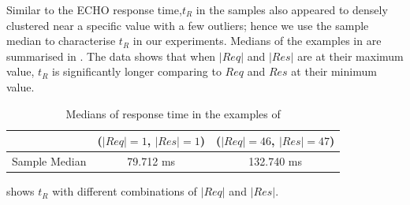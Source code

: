 Similar to the ECHO response time,$t_R$ in the samples also appeared to densely clustered near a specific value with a few outliers; hence we use the sample median to characterise $t_R$ in our experiments. Medians of the examples in  are summarised in . The data shows that when $|Req|$ and $|Res|$ are at their maximum value, $t_R$ is significantly longer comparing to $Req$ and $Res$ at their minimum value.
 
\begin{table}
	\center
	\begin{tabular}{|c|c|c|}
		\hline
		 				&($|Req| = 1$, $|Res| = 1$) 	& ($|Req| = 46$, $|Res| = 47$) 	\\ \hline
		 Sample Median	&79.712 ms                  			& 132.740 ms                   			\\ \hline
	\end{tabular}

	\caption{Medians of response time in the examples of }
	\label{Tbl: Median of response times in examples}
\end{table}

 shows $t_R$ with different combinations of $|Req|$ and $|Res|$.

